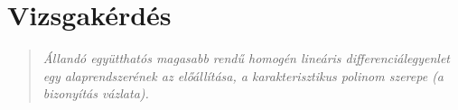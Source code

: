 \newpage
\section{Vizsgakérdés}
\begin{quote}
	\textit{Állandó együtthatós magasabb rendű homogén lineáris differenciálegyenlet egy alaprendszerének az előállítása, a karakterisztikus polinom szerepe (a bizonyítás vázlata).}
\end{quote}